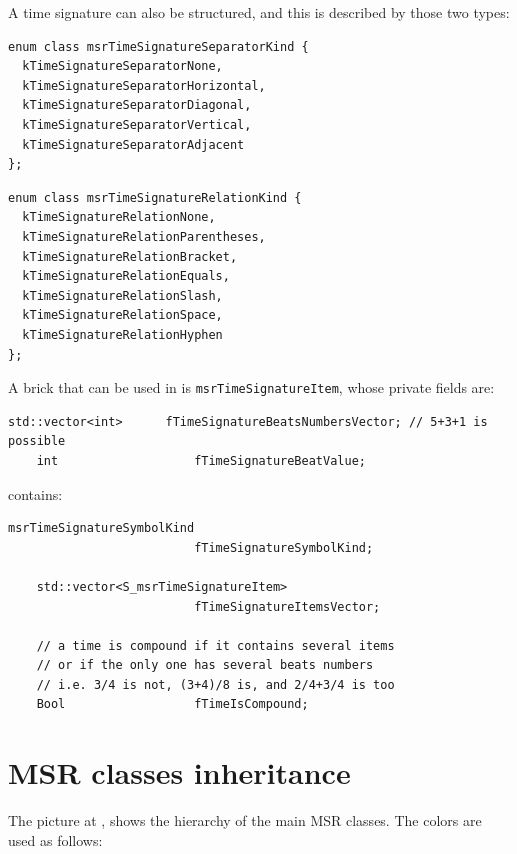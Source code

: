 A time signature can also be structured, and this is described by those two types:
\begin{lstlisting}[language=CPlusPlus]
enum class msrTimeSignatureSeparatorKind {
  kTimeSignatureSeparatorNone,
  kTimeSignatureSeparatorHorizontal,
  kTimeSignatureSeparatorDiagonal,
  kTimeSignatureSeparatorVertical,
  kTimeSignatureSeparatorAdjacent
};
\end{lstlisting}

\begin{lstlisting}[language=CPlusPlus]
enum class msrTimeSignatureRelationKind {
  kTimeSignatureRelationNone,
  kTimeSignatureRelationParentheses,
  kTimeSignatureRelationBracket,
  kTimeSignatureRelationEquals,
  kTimeSignatureRelationSlash,
  kTimeSignatureRelationSpace,
  kTimeSignatureRelationHyphen
};
\end{lstlisting}

A brick that can be used in  is {\tt msrTimeSignatureItem}, whose private fields are:
\begin{lstlisting}[language=CPlusPlus]
    std::vector<int>      fTimeSignatureBeatsNumbersVector; // 5+3+1 is possible
    int                   fTimeSignatureBeatValue;
\end{lstlisting}

 contains:
\begin{lstlisting}[language=CPlusPlus]
    msrTimeSignatureSymbolKind
                          fTimeSignatureSymbolKind;

    std::vector<S_msrTimeSignatureItem>
                          fTimeSignatureItemsVector;

    // a time is compound if it contains several items
    // or if the only one has several beats numbers
    // i.e. 3/4 is not, (3+4)/8 is, and 2/4+3/4 is too
    Bool                  fTimeIsCompound;
\end{lstlisting}


\section{MSR classes inheritance}\label{MSR classes inheritance}

The picture at , shows the hierarchy of the main MSR classes. The  colors are used as follows:

